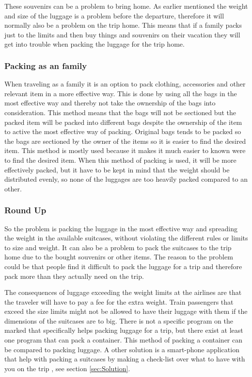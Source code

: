 These souvenirs can be a problem to bring home. As earlier mentioned the weight and size of the luggage is a problem before the departure, therefore it will normally also be a problem on the trip home.
This means that if a family packs just to the limits and then buy things and souvenirs on their vacation they will get into trouble when packing the luggage for the trip home.

\subsubsection{Packing as an family}
When traveling as a family it is an option to pack clothing, accessories and other relevant item in a more effective way. This is done by using all the bags in the most effective way and thereby not take the ownership of the bags into consideration. This method means that the bags will not be sectioned but the packed item will be packed into different bags despite the ownership of the item to active the most effective way of packing. Original bags tends to be packed so the bags are sectioned by the owner of the items so it is easier to find the desired item. This method is mostly used because it makes it much easier to known were to find the desired item. When this method of packing is used, it will be more effectively packed, but it have to be kept in mind that the weight should be distributed evenly, so none of the luggages are too heavily packed compared to an other.

\subsubsection{Round Up}
So the problem is packing the luggage in the most effective way and spreading the weight in the available suitcases, without violating the different rules or limits to size and weight. It can also be a problem to pack the suitcases to the trip home due to the bought souvenirs or other items. The reason to the problem could be that people find it difficult to pack the luggage for a trip and therefore pack more than they actually need on the trip.

The consequences of luggage exceeding the weight limits at the airlines are that the traveler will have to pay a fee for the extra weight.
Train passengers that exceed the size limits might not be allowed to have their luggage with them if the dimensions of the suitcases are to big.
There is not a specific program on the marked that specifically helps packing luggage for a trip, but there exist at least one program that can pack a container\citep{solvingmaze}. This method of packing a container can be compared to packing luggage. A other solution is a smart-phone application that help with packing a suitcases by making a check-list over what to have with you on the trip \citep{packingpro}, see section \ref{sec:Solution}.